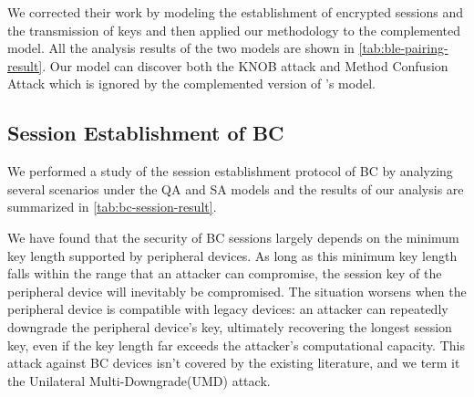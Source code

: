 We corrected their work by modeling the establishment of encrypted sessions and the transmission of keys and then applied our methodology to the complemented model. 
All the analysis results of the two models are shown in \autoref{tab:ble-pairing-result}.
Our model can discover both the  KNOB attack and Method Confusion Attack\cite{von2021method} which is ignored by the complemented version of \cite{shi2023blesc}'s model.

\subsection{Session Establishment of BC}
We performed a study of the session establishment protocol of BC by analyzing several scenarios under the QA and SA models and the results of our analysis are summarized in \autoref{tab:bc-session-result}.

We have found that the security of BC sessions largely depends on the minimum key length supported by peripheral devices. 
As long as this minimum key length falls within the range that an attacker can compromise, the session key of the peripheral device will inevitably be compromised. 
The situation worsens when the peripheral device is compatible with legacy devices: 
an attacker can repeatedly downgrade the peripheral device's key, ultimately recovering the longest session key, even if the key length far exceeds the attacker’s computational capacity.
This attack against BC devices isn't covered by the existing literature, and we term it the Unilateral Multi-Downgrade(UMD) attack.

